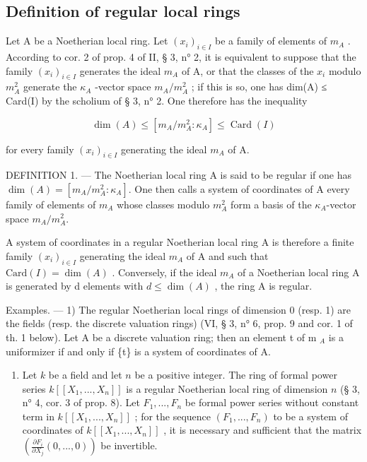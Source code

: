 \subsection{Definition of regular local rings}

Let A be a Noetherian local ring. Let \((x_{i})_{i\in I}\) be a family of elements of \(m_{A}\) . According to cor. 2 of prop. 4 of II, § 3, n° 2, it is equivalent to suppose that the family \((x_{i})_{i\in I}\) generates the ideal \(m_{A}\) of A, or that the classes of the \(x_{i}\) modulo \(m_{A}^{2}\) generate the \(\kappa_{A}\) -vector space \(m_{A}/m_{A}^{2}\) ; if this is so, one has dim(A) ≤ Card(I) by the scholium of § 3, n° 2. One therefore has the inequality

\[
\dim (A) \leqslant [ m _ {A} / m _ {A} ^ {2}: \kappa_ {A} ] \leqslant \operatorname{Card} (I)\tag{1}
\]

for every family \((x_{i})_{i\in I}\) generating the ideal \(m_{A}\) of A.

DEFINITION 1. --- The Noetherian local ring A is said to be regular if one has \(\dim(A) = [m_A/m_A^2:\kappa_A]\). One then calls a system of coordinates of A every family of elements of \(m_A\) whose classes modulo \(m_A^2\) form a basis of the \(\kappa_A\)-vector space \(m_A/m_A^2\).

A system of coordinates in a regular Noetherian local ring A is therefore a finite family \((x_{i})_{i\in I}\) generating the ideal \(m_{A}\) of A and such that \(\text{Card}(I) = \dim(A)\) . Conversely, if the ideal \(m_{A}\) of a Noetherian local ring A is generated by d elements with \(d \leqslant \dim(A)\) , the ring A is regular.

Examples. --- 1) The regular Noetherian local rings of dimension 0 (resp. 1) are the fields (resp. the discrete valuation rings) (VI, § 3, n° 6, prop. 9 and cor. 1 of th. 1 below). Let A be a discrete valuation ring; then an element t of m \(_{A}\) is a uniformizer if and only if \{t\} is a system of coordinates of A.

\begin{enumerate}
\def\labelenumi{\arabic{enumi})}
\setcounter{enumi}{1}
\tightlist
\item
  Let \(k\) be a field and let \(n\) be a positive integer. The ring of formal power series \(k[[X_1, ..., X_n]]\) is a regular Noetherian local ring of dimension \(n\) (§ 3, n° 4, cor. 3 of prop. 8). Let \(F_1, ..., F_n\) be formal power series without constant term in \(k[[X_1, ..., X_n]]\) ; for the sequence \((F_1, ..., F_n)\) to be a system of coordinates of \(k[[X_1, ..., X_n]]\) , it is necessary and sufficient that the matrix \(\left(\frac{\partial F_i}{\partial X_j}(0, ..., 0)\right)\) be invertible.
\end{enumerate}

